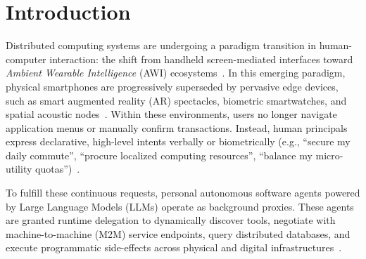 \documentclass[manuscript, screen, review]{jair}
\begin{document}

\maketitle

\section{Introduction}
\label{sec:intro}

Distributed computing systems are undergoing a paradigm transition in human-computer interaction: the shift from handheld screen-mediated interfaces toward \emph{Ambient Wearable Intelligence} (AWI) ecosystems~\cite{sun2026survey}. In this emerging paradigm, physical smartphones are progressively superseded by pervasive edge devices, such as smart augmented reality (AR) spectacles, biometric smartwatches, and spatial acoustic nodes~\cite{wu2023autogen}. Within these environments, users no longer navigate application menus or manually confirm transactions. Instead, human principals express declarative, high-level intents verbally or biometrically (e.g., ``secure my daily commute'', ``procure localized computing resources'', ``balance my micro-utility quotas'')~\cite{qin2024toolllm}.

To fulfill these continuous requests, personal autonomous software agents powered by Large Language Models (LLMs) operate as background proxies. These agents are granted runtime delegation to dynamically discover tools, negotiate with machine-to-machine (M2M) service endpoints, query distributed databases, and execute programmatic side-effects across physical and digital infrastructures~\cite{liu2024agentbench}.
\end{document}
